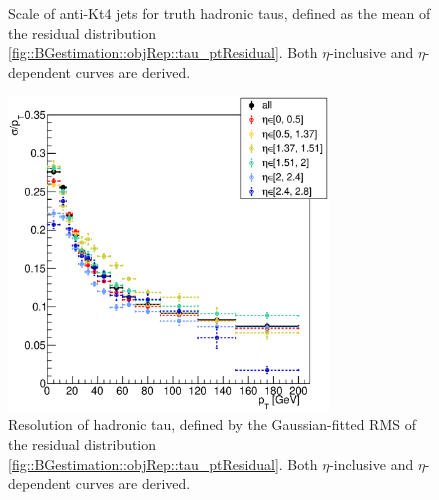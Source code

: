 \begin{figure}[htbp]
\begin{center}
\begin{minipage}[t]{.45\textwidth}
      \caption{Scale of anti-Kt4 jets for truth hadronic taus, defined as the mean of the residual distribution \ref{fig::BGestimation::objRep::tau_ptResidual}. Both $\eta$-inclusive and $\eta$-dependent curves are derived.}
      \label{fig::BGestimation::objRep::tau_scale}
    \end{minipage}
    \hfill
    \begin{minipage}[t]{.45\textwidth}
      \centering
      \includegraphics[width=85mm]{figures/BGestimation/ObjReplacement/method/tauRF/tauJet_resol.eps}
      \caption{Resolution of hadronic tau, defined by the Gaussian-fitted RMS of the residual distribution \ref{fig::BGestimation::objRep::tau_ptResidual}. Both $\eta$-inclusive and $\eta$-dependent curves are derived.}
      \label{fig::BGestimation::objRep::tau_resol}
    \end{minipage}
  \end{center}  
\end{figure}
\clearpage

